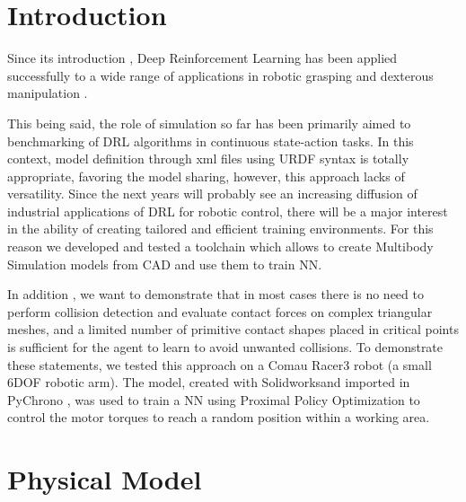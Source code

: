 \documentclass{sig-alternate-05-2015}
\begin{document}
%
%

%
%
\printccsdesc



\section{Introduction}
Since its introduction \cite{Mnih13}, Deep Reinforcement Learning has been applied successfully to a wide range of applications in robotic grasping \cite{Levine2016} \cite{LevineFDA15} and dexterous manipulation \cite{openai2018HandManipulation}.

This being said, the role of simulation so far has been primarily aimed to benchmarking of DRL algorithms in continuous state-action tasks. In this context, model definition through xml files using URDF syntax is totally appropriate, favoring the model sharing, however, this approach lacks of versatility.
Since the next years will probably see an increasing diffusion of industrial applications of DRL for robotic control, there will be a major interest in the ability of creating tailored and efficient training environments. 
For this reason we developed and tested a toolchain which allows to create Multibody Simulation models from CAD and use them to train NN. 

In addition , we want to demonstrate that in most cases there is no need to perform collision detection and evaluate contact forces on complex triangular meshes, and a limited number of primitive contact shapes placed in critical points is sufficient for the agent to learn to avoid unwanted collisions. 
To demonstrate these statements, we tested this approach on a Comau Racer3 robot (a small 6DOF robotic arm). The model, created with Solidworks\textregistered and imported in PyChrono \cite{Tasora2015ChronoAO}, was used to train a NN using Proximal Policy Optimization \cite{Schulman2017PPO}
to control the motor torques to reach a random position within a working area. 


\section{Physical Model}
\end{document}
